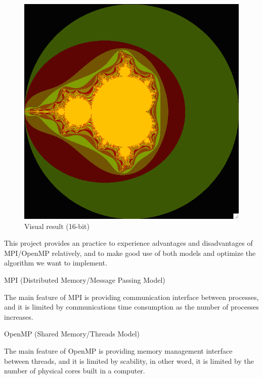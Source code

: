 \documentclass[12pt]{article}
\makeatletter
\renewenvironment{itemize}
{\list{$\bullet$}{\leftmargin\z@ \labelwidth\z@ \itemindent-\leftmargin
\let\makelabel\descriptionlabel}}
{\endlist}
\makeatother
\begin{document}
\begin{itemize}
\begin{figure}[ht]
\begin{minipage}{.48\textwidth}
            \includegraphics[scale=.4]{./coloring_16bit.png}
            \caption{Visual result (16-bit)}
        \end{minipage}
    \end{figure}
\end{itemize}

This project provides an practice to experience advantages and disadvantages of MPI/OpenMP relatively, and to make good use of both models and optimize the algorithm we want to implement.

\begin{itemize}
    \item MPI (Distributed Memory/Message Passing Model)
    \begin{flushleft}
        The main feature of MPI is providing communication interface between processes, and it is limited by communications time consumption as the number of processes increases.
    \end{flushleft}
    \item OpenMP (Shared Memory/Threads Model)
    \begin{flushleft}
        The main feature of OpenMP is providing memory management interface between threads, and it is limited by scability, in other word, it is limited by the number of physical cores built in a computer.
    \end{flushleft}
\end{itemize}
\end{document}
